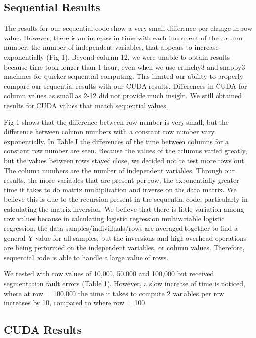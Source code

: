 \documentclass[letterpaper, 10 pt, conference]{ieeeconf}  %
\begin{document}
\subsection{Sequential Results}
The results for our sequential code show a very small difference per change in row value. However, there is an increase in time with each increment of the column number, the number of independent variables, that appears to increase exponentially (Fig 1). Beyond column 12, we were unable to obtain results because time took longer than 1 hour, even when we use crunchy3 and snappy3 machines for quicker sequential computing. This limited our ability to properly compare our sequential results with our CUDA results. Differences in CUDA for column values as small as 2-12 did not provide much insight. We still obtained results for CUDA values that match sequential values. 

Fig 1 shows that the difference between row number is very small, but the difference between column numbers with a constant row number vary exponentially. In Table I the differences of the time between columns for a constant row number are seen. Because the values of the columns varied greatly, but the values between rows stayed close, we decided not to test more rows out. The column numbers are the number of independent variables. Through our results, the more variables that are present per row, the exponentially greater time it takes to do matrix multiplication and inverse on the data matrix. We believe this is due to the recursion present in the sequential code, particularly in calculating the matrix inversion. We believe that there is little variation among row values because in calculating logistic regression multivariable logistic regression, the data samples/individuals/rows are averaged together to find a general Y value for all samples, but the inversions and high overhead operations are being performed on the independent variables, or column values. Therefore, sequential code is able to handle a large value of rows. 

We tested with row values of 10,000, 50,000 and 100,000 but received segmentation fault errors (Table 1). However, a slow increase of time is noticed, where at row = 100,000 the time it takes to compute 2 variables per row increases by 10, compared to where row = 100. 

\subsection{CUDA Results}
\end{document}
